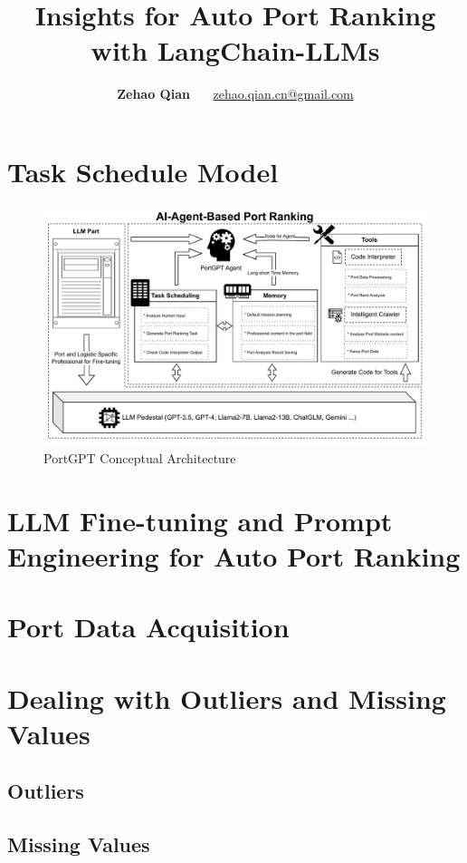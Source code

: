 \documentclass[11pt]{article} %
\title{Insights for Auto Port Ranking with LangChain-LLMs}
\author{\textbf{Zehao Qian} \ \ \ \href{mailto:zehao.qian.cn@gmail.com}{zehao.qian.cn@gmail.com}}
\begin{document}
\maketitle
% 
% 
% 
\tableofcontents
% 
% 
% 
% 
\section{Task Schedule Model}
% 
\begin{figure}[H]
    \centering
    \includegraphics[width=1.0\textwidth]{pic/PortGPT.pdf}
    \caption{PortGPT Conceptual Architecture}
    \label{fig:PortGPT}
\end{figure}
% 
\cite{9458712}
% 
% 
% 
% 
% 
\section{LLM Fine-tuning and Prompt Engineering for Auto Port Ranking}
% 
% 
% 
% 
% 
\section{Port Data Acquisition}
% 
% 
% 
% 
% 
% 
\section{Dealing with Outliers and Missing Values}
% 
% 
% 
% 
% 
% 
% 
% 
% 
\subsection{Outliers}
% 
% 
% 
% 
% 
% 
% 
% 
% 
% 
% 
\subsection{Missing Values}
% 
% 
% 
% 
% 
% 
% 
% 
% 
\end{document}
